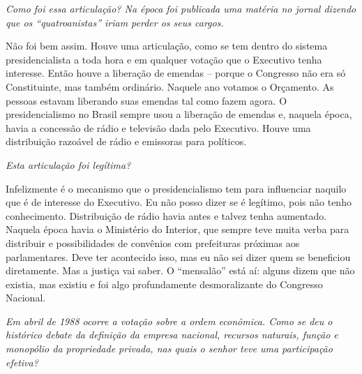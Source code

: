 \medskip

\noindent\emph{Como foi essa articulação? Na época foi publicada uma matéria no
jornal dizendo que os ``quatroanistas'' iriam perder os seus cargos.}

Não foi bem assim. Houve uma articulação, como se tem
dentro do sistema presidencialista a toda hora e em qualquer votação que
o Executivo tenha interesse. Então houve a liberação de emendas --
porque o Congresso não era só Constituinte, mas também ordinário.
Naquele ano votamos o Orçamento. As pessoas estavam liberando suas
emendas tal como fazem agora. O presidencialismo no Brasil sempre usou a
liberação de emendas e, naquela época, havia a concessão de rádio e
televisão dada pelo Executivo. Houve uma distribuição razoável de rádio
e emissoras para políticos.

\medskip

\noindent\emph{Esta articulação foi legítima?}

Infelizmente é o mecanismo que o presidencialismo tem
para influenciar naquilo que é de interesse do Executivo. Eu não posso
dizer se é legítimo, pois não tenho conhecimento. Distribuição de rádio
havia antes e talvez tenha aumentado. Naquela época havia o Ministério
do Interior, que sempre teve muita verba para distribuir e
possibilidades de convênios com prefeituras próximas aos parlamentares.
Deve ter acontecido isso, mas eu não sei dizer quem se beneficiou
diretamente. Mas a justiça vai saber. O ``mensalão'' está aí: alguns
dizem que não existia, mas existiu e foi algo profundamente
desmoralizante do Congresso Nacional.

\medskip

\noindent\emph{Em abril de 1988 ocorre a votação sobre a ordem econômica. Como
se deu o histórico debate da definição da empresa nacional, recursos
naturais, função e monopólio da propriedade privada, nas quais o senhor
teve uma participação efetiva?}

